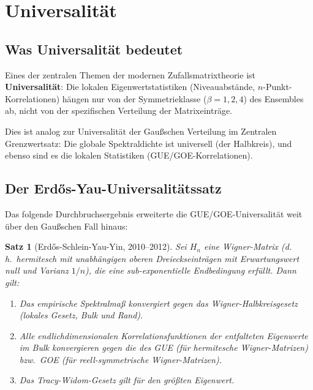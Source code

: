 \documentclass[12pt,a4paper]{amsart}
\newtheorem{theorem}{Satz}[section]
\theoremstyle{definition}
\theoremstyle{remark}
\begin{document}
\section{Universalität}
\label{sec:universitaet}

\subsection{Was Universalität bedeutet}

Eines der zentralen Themen der modernen Zufallsmatrixtheorie ist
\textbf{Universalität}: Die lokalen Eigenwertstatistiken (Niveauabstände,
$n$-Punkt-Korrelationen) hängen nur von der Symmetrieklasse ($\beta = 1, 2, 4$)
des Ensembles ab, nicht von der spezifischen Verteilung der Matrixeinträge.

Dies ist analog zur Universalität der Gaußschen Verteilung im Zentralen
Grenzwertsatz: Die globale Spektraldichte ist universell (der Halbkreis),
und ebenso sind es die lokalen Statistiken (GUE/GOE-Korrelationen).

\subsection{Der Erdős-Yau-Universalitätssatz}

Das folgende Durchbruchsergebnis erweiterte die GUE/GOE-Universalität weit
über den Gaußschen Fall hinaus:

\begin{theorem}[Erdős-Schlein-Yau-Yin, 2010--2012]
\label{thm:universitaet}
Sei $H_n$ eine Wigner-Matrix (d.\,h.\ hermitesch mit unabhängigen oberen
Dreieckseinträgen mit Erwartungswert null und Varianz $1/n$), die eine
sub-exponentielle Endbedingung erfüllt. Dann gilt:
\begin{enumerate}[label=(\roman*)]
  \item Das empirische Spektralmaß konvergiert gegen das Wigner-Halbkreisgesetz
    (lokales Gesetz, Bulk und Rand).
  \item Alle endlichdimensionalen Korrelationsfunktionen der entfalteten Eigenwerte
    im Bulk konvergieren gegen die des GUE (für hermitesche Wigner-Matrizen)
    bzw.\ GOE (für reell-symmetrische Wigner-Matrizen).
  \item Das Tracy-Widom-Gesetz gilt für den größten Eigenwert.
\end{enumerate}
\end{theorem}
\end{document}
